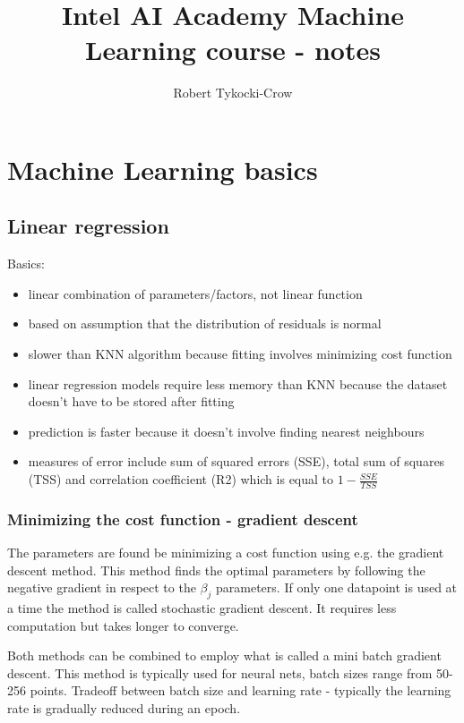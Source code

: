 \documentclass[11pt]{book}
\begin{document}
\author{Robert Tykocki-Crow}
\title{Intel AI Academy Machine Learning course - notes}
\maketitle

\medskip

\chapter{Machine Learning basics}
\section{Linear regression}


Basics:
\begin{itemize}
    \item linear combination of parameters/factors, not linear function
    \item based on assumption that the distribution of residuals is normal
    \item slower than KNN algorithm because fitting involves minimizing cost function
    \item linear regression models require less memory than KNN because the dataset doesn't have to be stored after fitting
    \item prediction is faster because it doesn't involve finding nearest neighbours
    \item measures of error include sum of squared errors (SSE), total sum of squares (TSS) and correlation coefficient (R2) which is equal to $1-\frac{SSE}{TSS}$
\end{itemize}

\subsection{Minimizing the cost function - gradient descent}

The parameters are found be minimizing a cost function using e.g. the gradient descent method. This method finds the optimal parameters by following the negative gradient in respect to the $\beta_j$ parameters. If only one datapoint is used at a time the method is called stochastic gradient descent. It requires less computation but takes longer to converge. 

Both methods can be combined to employ what is called a mini batch gradient descent. This method is typically used for neural nets, batch sizes range from 50-256 points. Tradeoff between batch size and learning rate - typically the learning rate is gradually reduced during an epoch.
\end{document}
